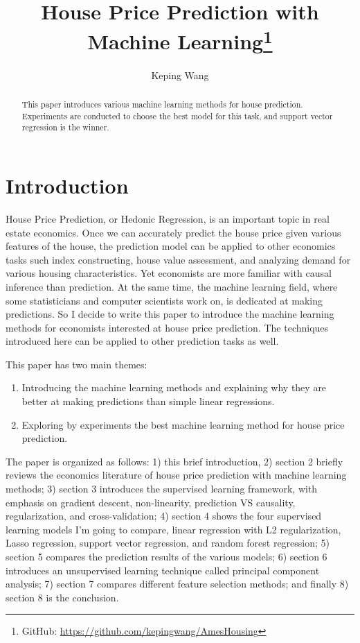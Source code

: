 \documentclass[a4paper]{article}
\title{House Price Prediction with Machine Learning\footnote{GitHub: \url{https://github.com/kepingwang/AmesHousing}}}
\author{Keping Wang}
\begin{document}
\maketitle

\begin{abstract}
This paper introduces various machine learning methods for house prediction. Experiments are conducted to choose the best model for this task, and support vector regression is the winner.
\end{abstract}

\section{Introduction}
House Price Prediction, or Hedonic Regression, is an important topic in real estate economics. Once we can accurately predict the house price given various features of the house, the prediction model can be applied to other economics tasks such index constructing, house value assessment, and analyzing demand for various housing characteristics. Yet economists are more familiar with causal inference than prediction. At the same time, the machine learning field, where some statisticians and computer scientists work on, is dedicated at making predictions. So I decide to write this paper to introduce the machine learning methods for economists interested at house price prediction. The techniques introduced here can be applied to other prediction tasks as well. 

This paper has two main themes:
\begin{enumerate}
  \item Introducing the machine learning methods and explaining why they are better at making predictions than simple linear regressions.
  \item Exploring by experiments the best machine learning method for house price prediction.
\end{enumerate}

The paper is organized as follows: 1) this brief introduction, 2) section 2 briefly reviews the economics literature of house price prediction with machine learning methods; 3) section 3 introduces the supervised learning framework, with emphasis on gradient descent, non-linearity, prediction VS causality, regularization, and cross-validation; 4) section 4 shows the four supervised learning models I'm going to compare, linear regression with L2 regularization, Lasso regression, support vector regression, and random forest regression; 5) section 5 compares the prediction results of the various models; 6) section 6 introduces an unsupervised learning technique called principal component analysis; 7) section 7 compares different feature selection methods; and finally 8) section 8 is the conclusion.
\end{document}
